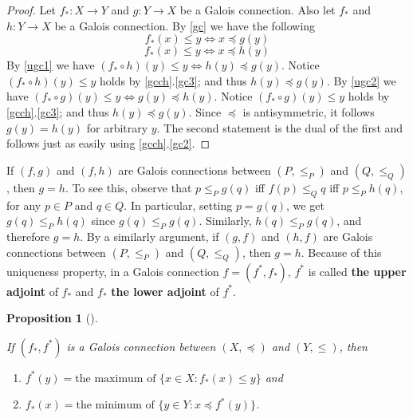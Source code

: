 \documentclass[
  twoside,
  12pt,
  letterpaper,
  fleqn]{article}
\providecommand{\tightlist}{%
  \setlength{\itemsep}{0pt}\setlength{\parskip}{0pt}}\usepackage{longtable,booktabs,array}
\theoremstyle{plain}
\newtheorem{proposition}{Proposition}[section]
\theoremstyle{definition}
\theoremstyle{definition}
\theoremstyle{remark}
\begin{document}
\begin{proof}

Let \(f_*:X \to Y\) and \(g:Y\to X\) be a Galois connection. Also let
\(f_*\) and \(h:Y\to X\) be a Galois connection. By \eqref{gc} we have
the following\\
\begin{equation}
\label{ugc1}
f_*(x)\leqslant y \Longleftrightarrow x\preceq g(y)
\end{equation} \begin{equation}
\label{ugc2}
f_*(x)\leqslant y \Longleftrightarrow x\preceq h(y)
\end{equation} By \eqref{ugc1} we have
\((f_*\circ h)(y)\leqslant y\Longleftrightarrow h(y)\preceq g(y)\).
Notice \((f_*\circ h)(y)\leqslant y\) holds by \eqref{gcch}.\eqref{gc3};
and thus \(h(y)\preceq g(y)\). By \eqref{ugc2} we have
\((f_*\circ g)(y)\leqslant y \Longleftrightarrow g(y)\preceq h(y)\).
Notice \((f_*\circ g)(y)\leqslant y\) holds by \eqref{gcch}.\eqref{gc3};
and thus \(h(y)\preceq g(y)\). Since \(\preceq\) is antisymmetric, it
follows \(g(y)=h(y)\) for arbitrary \(y\). The second statement is the
dual of the first and follows just as easily using
\eqref{gcch}.\eqref{gc2}.

\end{proof}

If \((f,g)\) and \((f,h)\) are Galois connections between \((P,\le_P)\)
and \((Q,\le_Q)\), then \(g=h\). To see this, observe that
\(p\le_P g(q)\) iff \(f(p)\le_Q q\) iff \(p \le_P h(q)\), for any
\(p\in P\) and \(q\in Q\). In particular, setting \(p=g(q)\), we get
\(g(q)\le_P h(q)\) since \(g(q)\le_P g(q)\). Similarly,
\(h(q)\le_P g(q)\), and therefore \(g=h\). By a similarly argument, if
\((g,f)\) and \((h,f)\) are Galois connections between \((P,\le_P)\) and
\((Q,\le_Q)\), then \(g=h\). Because of this uniqueness property, in a
Galois connection \(f=(f^*,f_*)\), \(f^*\) is called \textbf{the upper
adjoint} of \(f_*\) and \(f_*\) \textbf{the lower adjoint} of \(f^*\).

\begin{proposition}[]\protect\hypertarget{prp-maximum-minimum}{}\label{prp-maximum-minimum}

If \((f_*, f^*)\) is a Galois connection between \((X,\preceq)\) and
\((Y,\leqslant)\), then

\begin{enumerate}
\def\labelenumi{\arabic{enumi}.}
\tightlist
\item
  \(f^*(y)=\textrm{the maximum of } \{x\in X : f_*(x)\leqslant y\}\) and
\item
  \(f_*(x)=\textrm{the minimum of } \{y\in Y : x\preceq f^*(y)\}\).
\end{enumerate}

\end{proposition}
\end{document}
